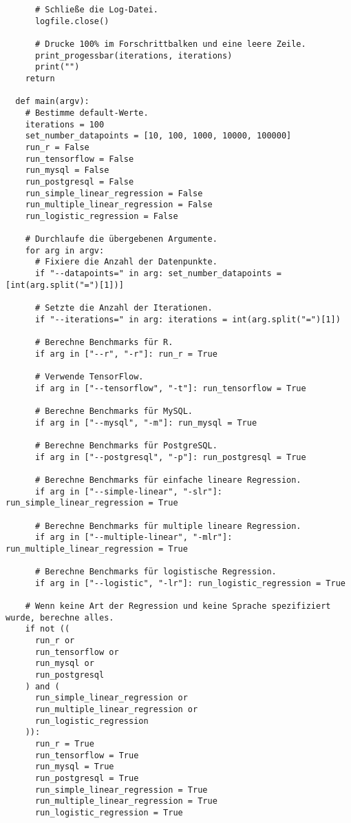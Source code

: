 \begin{verbatim}
      # Schließe die Log-Datei.
      logfile.close()

      # Drucke 100% im Forschrittbalken und eine leere Zeile.
      print_progessbar(iterations, iterations)
      print("")
    return

  def main(argv):
    # Bestimme default-Werte.
    iterations = 100
    set_number_datapoints = [10, 100, 1000, 10000, 100000]
    run_r = False
    run_tensorflow = False
    run_mysql = False
    run_postgresql = False
    run_simple_linear_regression = False
    run_multiple_linear_regression = False
    run_logistic_regression = False

    # Durchlaufe die übergebenen Argumente.
    for arg in argv:
      # Fixiere die Anzahl der Datenpunkte.
      if "--datapoints=" in arg: set_number_datapoints = [int(arg.split("=")[1])]

      # Setzte die Anzahl der Iterationen.
      if "--iterations=" in arg: iterations = int(arg.split("=")[1])

      # Berechne Benchmarks für R.
      if arg in ["--r", "-r"]: run_r = True

      # Verwende TensorFlow.
      if arg in ["--tensorflow", "-t"]: run_tensorflow = True

      # Berechne Benchmarks für MySQL.
      if arg in ["--mysql", "-m"]: run_mysql = True

      # Berechne Benchmarks für PostgreSQL.
      if arg in ["--postgresql", "-p"]: run_postgresql = True

      # Berechne Benchmarks für einfache lineare Regression.
      if arg in ["--simple-linear", "-slr"]: run_simple_linear_regression = True

      # Berechne Benchmarks für multiple lineare Regression.
      if arg in ["--multiple-linear", "-mlr"]: run_multiple_linear_regression = True

      # Berechne Benchmarks für logistische Regression.
      if arg in ["--logistic", "-lr"]: run_logistic_regression = True

    # Wenn keine Art der Regression und keine Sprache spezifiziert wurde, berechne alles.
    if not ((
      run_r or
      run_tensorflow or
      run_mysql or
      run_postgresql
    ) and (
      run_simple_linear_regression or
      run_multiple_linear_regression or
      run_logistic_regression
    )):
      run_r = True
      run_tensorflow = True
      run_mysql = True
      run_postgresql = True
      run_simple_linear_regression = True
      run_multiple_linear_regression = True
      run_logistic_regression = True


\end{verbatim}
